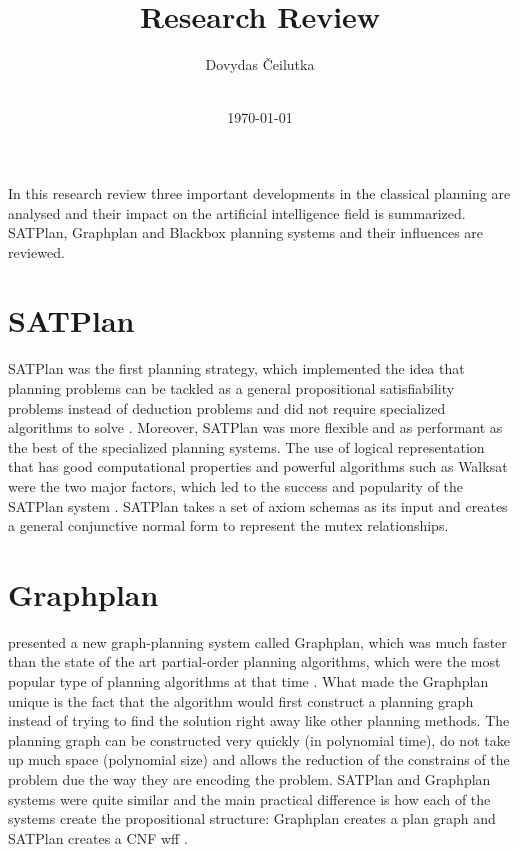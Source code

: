 \documentclass[11pt]{article}
\title{\vspace{-2.0cm}\textbf{Research Review}}
\author{Dovydas Čeilutka\\\\}
\date{\today}
\begin{document}
  \maketitle

  In this research review three important developments in the classical planning are analysed and their impact on the artificial intelligence field is summarized. SATPlan, Graphplan and Blackbox planning systems and their influences are reviewed.
  
  \section{SATPlan}
  
  SATPlan was the first planning strategy, which implemented the idea that planning problems can be tackled as a general propositional satisfiability problems instead of deduction problems and did not require specialized algorithms to solve \autocite{kautz1992planning, kautz1996pushing}. Moreover, SATPlan was more flexible and as performant as the best of the specialized planning systems. The use of logical representation that has good computational properties and powerful algorithms such as Walksat were the two major factors, which led to the success and popularity of the SATPlan system \autocite{kautz1999unifying}. SATPlan takes a set of axiom schemas as its input and creates a general conjunctive normal form to represent the mutex relationships.
  
  \section{Graphplan}
  
  \cite{blum1997fast} presented a new graph-planning system called Graphplan, which was much faster than the  state of the art partial-order planning algorithms, which were the most popular type of planning algorithms at that time \autocite{russell2010artificial}. What made the Graphplan unique is the fact that the algorithm would first construct a planning graph instead of trying to find the solution right away like other planning methods. The planning graph can be constructed very quickly (in polynomial time), do not take up much space (polynomial size) and allows the reduction of the constrains of the problem due the way they are encoding the problem. SATPlan and Graphplan systems were quite similar and the main practical difference is how each of the systems create the propositional structure: Graphplan creates a plan graph and SATPlan creates a CNF wff \autocite{kautz1999unifying}.
  
\end{document}
